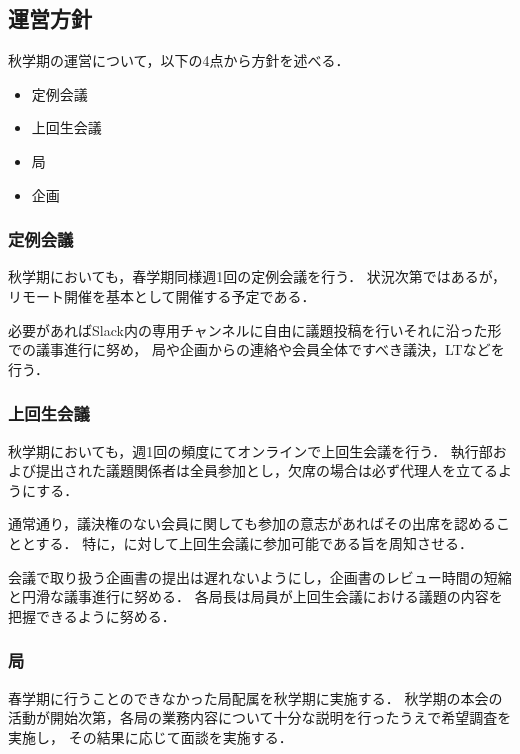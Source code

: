\subsection*{運営方針}


秋学期の運営について，以下の4点から方針を述べる．
\begin{itemize}
    \item 定例会議
    \item 上回生会議
    \item 局
    \item 企画
\end{itemize}

\subsubsection*{定例会議}
秋学期においても，春学期同様週1回の定例会議を行う．
状況次第ではあるが，リモート開催を基本として開催する予定である．

必要があればSlack内の専用チャンネルに自由に議題投稿を行いそれに沿った形での議事進行に努め，
局や企画からの連絡や会員全体ですべき議決，LTなどを行う．


\subsubsection*{上回生会議}
秋学期においても，週1回の頻度にてオンラインで上回生会議を行う．
執行部および提出された議題関係者は全員参加とし，欠席の場合は必ず代理人を立てるようにする．

通常通り，議決権のない会員に関しても参加の意志があればその出席を認めることとする．
特に，\firstGrade{}に対して上回生会議に参加可能である旨を周知させる．

会議で取り扱う企画書の提出は遅れないようにし，企画書のレビュー時間の短縮と円滑な議事進行に努める．
各局長は局員が上回生会議における議題の内容を把握できるように努める．


\subsubsection*{局}
春学期に行うことのできなかった局配属を秋学期に実施する．
秋学期の本会の活動が開始次第，各局の業務内容について十分な説明を行ったうえで希望調査を実施し，
その結果に応じて面談を実施する．

